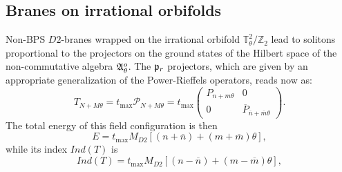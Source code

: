 \documentclass[a4paper,12pt]{article}
\begin{document}
\subsection{ Branes on irrational orbifolds}

Non-BPS $D2$-branes wrapped on the irrational orbifold
$\mathbb{T}_{\theta }^{2}/\mathbb{Z}_{2}$ lead to solitons
proportional to the projectors on the ground states of the Hilbert
space of the non-commutative algebra $\frak{A}^{o}_{\theta}$. The
$\frak{p}_{r}$ projectors, which are given by an appropriate
generalization of the Power-Rieffels operators, reads now as:
\begin{equation}\label{irtsolution}
T_{N+M\theta }=t_{\text{max}}\mathcal{P}_{N+M\theta }=t_{\text{max}}\left(
\begin{array}{cc}
P_{n+m\theta } & 0 \\
0 & \overline{P}_{\overline{n}+\overline{m}\theta }
\end{array}
\right).
\end{equation}
The total energy of this field configuration is then
\begin{equation}\label{irrenergy}
E=t_{\text{max}}M_{D2}[(n+\overline{n})+(m+\overline{m})\theta ],
\end{equation}
while its index $Ind(T)$ is
\begin{equation}\label{index}
Ind(T)=t_{\text{max}}M_{D2}[(n-\overline{n})+(m-\overline{m})\theta ],
\end{equation}
\end{document}
